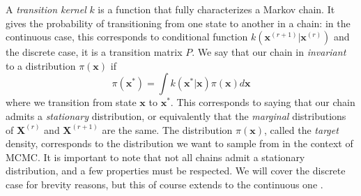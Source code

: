 \documentclass[12pt]{memoir}
\newcommand{\mb}{\mathbf}
\newcommand{\ti}{\textit}
\begin{document}
A \ti{transition kernel} $k$ is a function that fully characterizes a Markov chain. It gives the probability of transitioning from one state to another in a chain: in the continuous case, this corresponds to conditional function $k(\mb x^{(r+1)}| \mb x^{(r)})$ and the discrete case, it is a transition matrix $P$. We say that our chain in \ti{invariant} to a distribution $\pi(\mb x)$ if
\begin{equation}
    \pi(\mb x^*) = \int k(\mb x^*|\mb x) \pi(\mb x)d\mb x
\end{equation}
where we transition from state $\mb x$ to $\mb x^*$.
This corresponds to saying that our chain admits a \ti{stationary} distribution, or equivalently that the \ti{marginal} distributions of $\mb X^{(r)}$ and $\mb X^{(r+1)}$ are the same. The distribution $\pi(\mb x)$, called the \ti{target} density, corresponds to the distribution we want to sample from in the context of MCMC. It is important to note that not all chains admit a stationary distribution, and a few properties must be respected. We will cover the discrete case for brevity reasons, but this of course extends to the continuous one \cite{mcmc:slides:Rigon2024Mar,wiki:markov-chain}.
\end{document}
